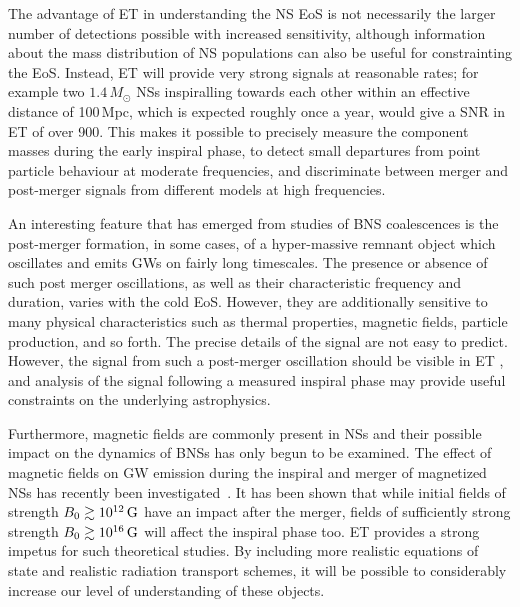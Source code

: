 The advantage of ET in understanding the NS EoS is not
necessarily the larger number of detections possible with increased
sensitivity, although information about the mass distribution of NS 
populations can also be useful for constrainting the EoS. Instead, ET
will provide very strong signals at reasonable rates; for example two
$1.4\,M_\odot$ NSs inspiralling towards each other within an
effective distance of 100\,Mpc, which is expected roughly once a year,
would give a SNR in ET of over 900.  This makes it possible to precisely
measure the component masses during the early inspiral phase, to detect
small departures from point particle behaviour at moderate
frequencies, and discriminate between merger and post-merger signals
from different models at high frequencies.

An interesting feature that has emerged from studies of BNS
coalescences is the post-merger formation, in some cases, of a
hyper-massive remnant object which oscillates and emits GWs
on fairly long timescales.  The presence or absence of such
post merger oscillations, as well as their characteristic frequency
and duration, varies with the cold EoS. However, they are additionally
sensitive to many physical characteristics such as thermal properties, 
magnetic fields, particle production, and so forth.  The precise details of
the signal are not easy to predict.  However, the signal from such 
a post-merger oscillation should be visible in ET \cite{Shibata2005eos}, 
and analysis of the signal following a measured inspiral phase may provide
useful constraints on the underlying astrophysics.


Furthermore, magnetic fields are commonly present in 
NSs and their possible impact on the dynamics of BNSs
has only begun to be examined.  The effect of magnetic fields on GW
emission during the inspiral and merger of magnetized NSs has 
recently been investigated~\cite{Giacomazzo:2009mp}. It
has been shown that while initial fields of strength 
$B_{0}\gtrsim 10^{12}\,{\rm G}$ have an impact after the merger,
fields of sufficiently strong strength $B_{0}\gtrsim 10^{16}\,{\rm G}$
will affect the inspiral phase too.
ET provides a strong impetus for such theoretical studies.  By 
including more realistic equations of state and realistic radiation 
transport schemes, it will be possible to considerably increase our 
level of understanding of these objects. 

